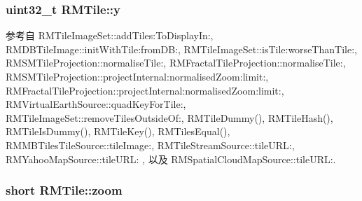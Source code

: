 \hypertarget{struct_r_m_tile_a3a4a0631b9b4aeeb72165965f7363cf7}{
\subsubsection[{y}]{\setlength{\rightskip}{0pt plus 5cm}uint32\-\_\-t R\-M\-Tile\-::y}}\label{struct_r_m_tile_a3a4a0631b9b4aeeb72165965f7363cf7}


参考自 R\-M\-Tile\-Image\-Set\-::add\-Tiles\-:\-To\-Display\-In\-:, R\-M\-D\-B\-Tile\-Image\-::init\-With\-Tile\-:from\-D\-B\-:, R\-M\-Tile\-Image\-Set\-::is\-Tile\-:worse\-Than\-Tile\-:, R\-M\-S\-M\-Tile\-Projection\-::normalise\-Tile\-:, R\-M\-Fractal\-Tile\-Projection\-::normalise\-Tile\-:, R\-M\-S\-M\-Tile\-Projection\-::project\-Internal\-:normalised\-Zoom\-:limit\-:, R\-M\-Fractal\-Tile\-Projection\-::project\-Internal\-:normalised\-Zoom\-:limit\-:, R\-M\-Virtual\-Earth\-Source\-::quad\-Key\-For\-Tile\-:, R\-M\-Tile\-Image\-Set\-::remove\-Tiles\-Outside\-Of\-:, R\-M\-Tile\-Dummy(), R\-M\-Tile\-Hash(), R\-M\-Tile\-Is\-Dummy(), R\-M\-Tile\-Key(), R\-M\-Tiles\-Equal(), R\-M\-M\-B\-Tiles\-Tile\-Source\-::tile\-Image\-:, R\-M\-Tile\-Stream\-Source\-::tile\-U\-R\-L\-:, R\-M\-Yahoo\-Map\-Source\-::tile\-U\-R\-L\-: , 以及 R\-M\-Spatial\-Cloud\-Map\-Source\-::tile\-U\-R\-L\-:.

\hypertarget{struct_r_m_tile_a3fcd336d510455edc2d10d9f0f5887d8}{
\subsubsection[{zoom}]{\setlength{\rightskip}{0pt plus 5cm}short R\-M\-Tile\-::zoom}}\label{struct_r_m_tile_a3fcd336d510455edc2d10d9f0f5887d8}


